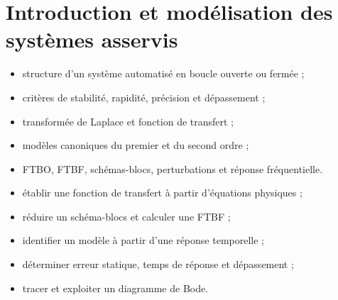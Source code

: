 \documentclass[10pt,a4paper,openany]{book}
\begin{document}
\tableofcontents
\clearpage
\chapter{Introduction et modélisation des systèmes asservis}

\begin{savoirs}
\begin{itemize}
  \item structure d'un système automatisé en boucle ouverte ou fermée ;
  \item critères de stabilité, rapidité, précision et dépassement ;
  \item transformée de Laplace et fonction de transfert ;
  \item modèles canoniques du premier et du second ordre ;
  \item FTBO, FTBF, schémas-blocs, perturbations et réponse fréquentielle.
\end{itemize}
\end{savoirs}

\begin{savoirfaire}
\begin{itemize}
  \item établir une fonction de transfert à partir d'équations physiques ;
  \item réduire un schéma-blocs et calculer une FTBF ;
  \item identifier un modèle à partir d'une réponse temporelle ;
  \item déterminer erreur statique, temps de réponse et dépassement ;
  \item tracer et exploiter un diagramme de Bode.
\end{itemize}
\end{savoirfaire}






\end{document}
